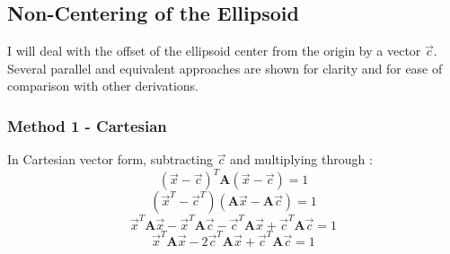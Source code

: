 \documentclass{article}
\def\mat#1{\mathbf{#1}}
\begin{document}
\subsection{Non-Centering of the Ellipsoid}
I will deal with the offset of the ellipsoid center from the origin by a vector
$\vec{c}$. Several parallel and equivalent approaches are shown for clarity and
for ease of comparison with other derivations.
%
\subsubsection{Method 1 - Cartesian}
In Cartesian vector form, subtracting $\vec{c}$ and multiplying through :
\begin{equation}
(\vec{x}-\vec{c})^T \mat{A} (\vec{x}-\vec{c}) = 1
\end{equation}
\begin{equation}
(\vec{x}^T-\vec{c}^T) (\mat{A}\vec{x}- \mat{A}\vec{c}) = 1
\end{equation}
\begin{equation}
\vec{x}^T \mat{A}\vec{x} - \vec{x}^T\mat{A}\vec{c}
- \vec{c}^T\mat{A}\vec{x} + \vec{c}^T\mat{A}\vec{c} = 1
\end{equation}
\begin{equation}
\vec{x}^T \mat{A}\vec{x} - 2\vec{c}^T\mat{A}\vec{x} + \vec{c}^T\mat{A}\vec{c} = 1
\end{equation}
%
\end{document}
